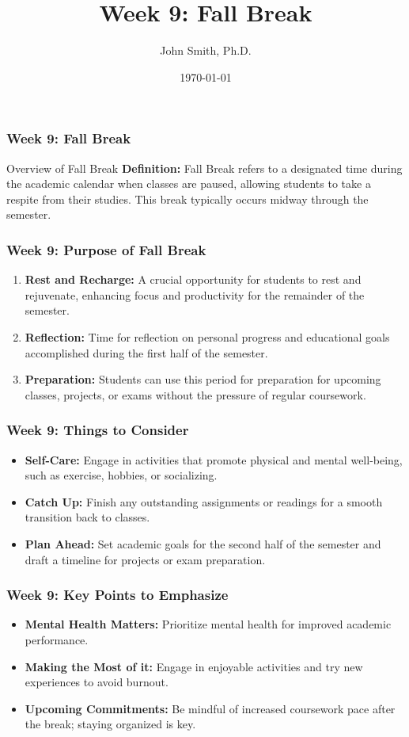 \documentclass[aspectratio=169]{beamer}
\title[Week 9: Fall Break]{Week 9: Fall Break}
\author[J. Smith]{John Smith, Ph.D.}
\institute[University Name]{
  Department of Computer Science\\
  University Name\\
  \vspace{0.3cm}
  Email: email@university.edu
}
\date{\today}
\begin{document}
\frame{\titlepage}

\begin{frame}[fragile]
    \frametitle{Week 9: Fall Break}
    \begin{block}{Overview of Fall Break}
        \textbf{Definition:} Fall Break refers to a designated time during the academic calendar when classes are paused, allowing students to take a respite from their studies. This break typically occurs midway through the semester.
    \end{block}
\end{frame}

\begin{frame}[fragile]
    \frametitle{Week 9: Purpose of Fall Break}
    \begin{enumerate}
        \item \textbf{Rest and Recharge:} A crucial opportunity for students to rest and rejuvenate, enhancing focus and productivity for the remainder of the semester.
        \item \textbf{Reflection:} Time for reflection on personal progress and educational goals accomplished during the first half of the semester.
        \item \textbf{Preparation:} Students can use this period for preparation for upcoming classes, projects, or exams without the pressure of regular coursework.
    \end{enumerate}
\end{frame}

\begin{frame}[fragile]
    \frametitle{Week 9: Things to Consider}
    \begin{itemize}
        \item \textbf{Self-Care:} Engage in activities that promote physical and mental well-being, such as exercise, hobbies, or socializing.
        \item \textbf{Catch Up:} Finish any outstanding assignments or readings for a smooth transition back to classes.
        \item \textbf{Plan Ahead:} Set academic goals for the second half of the semester and draft a timeline for projects or exam preparation.
    \end{itemize}
\end{frame}

\begin{frame}[fragile]
    \frametitle{Week 9: Key Points to Emphasize}
    \begin{itemize}
        \item \textbf{Mental Health Matters:} Prioritize mental health for improved academic performance.
        \item \textbf{Making the Most of it:} Engage in enjoyable activities and try new experiences to avoid burnout.
        \item \textbf{Upcoming Commitments:} Be mindful of increased coursework pace after the break; staying organized is key.
    \end{itemize}
\end{frame}
\end{document}
